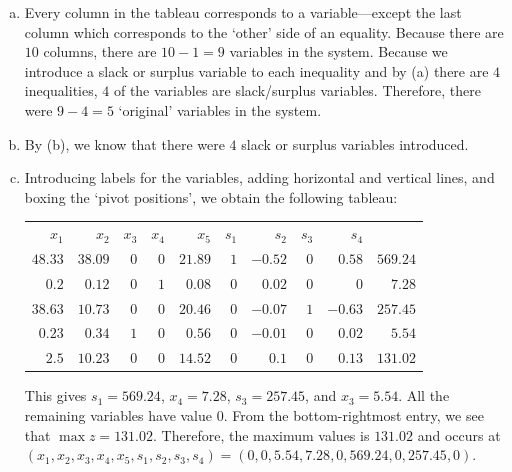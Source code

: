 \documentclass[12pt,letterpaper]{exam}
\begin{document}
\begin{questions}
\begin{enumerate}[(a)]
\item Every column in the tableau corresponds to a variable---except the last column which corresponds to the `other' side of an equality. Because there are $10$ columns, there are $10 - 1= 9$ variables in the system. Because we introduce a slack or surplus variable to each inequality and by (a) there are $4$ inequalities, $4$ of the variables are slack/surplus variables. Therefore, there were $9 - 4= 5$ `original' variables in the system. 

\item By (b), we know that there were $4$ slack or surplus variables introduced. 

\item Introducing labels for the variables, adding horizontal and vertical lines, and boxing the `pivot positions', we obtain the following tableau: \par
	\begin{table}[H]
	\centering
	\begin{tabular}{rrrrrrrrrr}
	{\footnotesize $x_1$} & {\footnotesize $x_2$} & {\footnotesize $x_3$} & {\footnotesize $x_4$} & {\footnotesize $x_5$} & {\footnotesize $s_1$} & {\footnotesize $s_2$} & {\footnotesize $s_3$} & {\footnotesize $s_4$} & \\ 
	$48.33$ & $38.09$ & $0$ & $0$ & $21.89$ & $\boxed{1}$ & $-0.52$ & $0$ & \multicolumn{1}{r|}{$0.58$} & $569.24$ \\
	$0.2$ & $0.12$ & $0$ & $\boxed{1}$ & $0.08$ & $0$ & $0.02$ & $0$ & \multicolumn{1}{r|}{$0$} & $7.28$ \\
	$38.63$ & $10.73$ & $0$ & $0$ & $20.46$ & $0$ & $-0.07$ & $\boxed{1}$ & \multicolumn{1}{r|}{$-0.63$} & $257.45$ \\
	$0.23$ & $0.34$ & $\boxed{1}$ & $0$ & $0.56$ & $0$ & $-0.01$ & $0$ & \multicolumn{1}{r|}{$0.02$} & $5.54$ \\ \hline
	$2.5$ & $10.23$ & $0$ & $0$ & $14.52$ & $0$ & $0.1$ & $0$ & \multicolumn{1}{r|}{$0.13$} & $131.02$
	\end{tabular}
	\end{table}
This gives $s_1= 569.24$, $x_4= 7.28$, $s_3= 257.45$, and $x_3= 5.54$. All the remaining variables have value $0$. From the bottom-rightmost entry, we see that $\max z= 131.02$. Therefore, the maximum values is $131.02$ and occurs at $(x_1, x_2, x_3, x_4, x_5, s_1, s_2, s_3, s_4)= (0, 0, 5.54, 7.28, 0, 569.24, 0, 257.45, 0)$.
\end{enumerate}




\end{questions}
\end{document}
